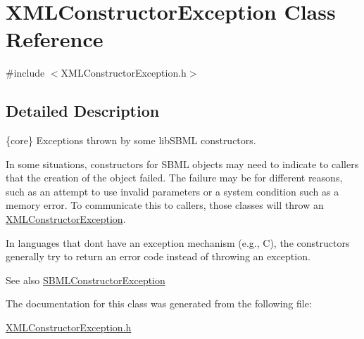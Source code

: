 \hypertarget{class_x_m_l_constructor_exception}{}\section{X\+M\+L\+Constructor\+Exception Class Reference}
\label{class_x_m_l_constructor_exception}


{\ttfamily \#include $<$X\+M\+L\+Constructor\+Exception.\+h$>$}



\subsection{Detailed Description}
\{core\} Exceptions thrown by some lib\+S\+B\+ML constructors.



In some situations, constructors for S\+B\+ML objects may need to indicate to callers that the creation of the object failed. The failure may be for different reasons, such as an attempt to use invalid parameters or a system condition such as a memory error. To communicate this to callers, those classes will throw an \hyperlink{class_x_m_l_constructor_exception}{X\+M\+L\+Constructor\+Exception}. 

In languages that don\textquotesingle{}t have an exception mechanism (e.\+g., C), the constructors generally try to return an error code instead of throwing an exception.

\begin{DoxySeeAlso}{See also}
\hyperlink{class_s_b_m_l_constructor_exception}{S\+B\+M\+L\+Constructor\+Exception} 
\end{DoxySeeAlso}


The documentation for this class was generated from the following file\+:\begin{DoxyCompactItemize}
\item 
\hyperlink{_x_m_l_constructor_exception_8h}{X\+M\+L\+Constructor\+Exception.\+h}\end{DoxyCompactItemize}
